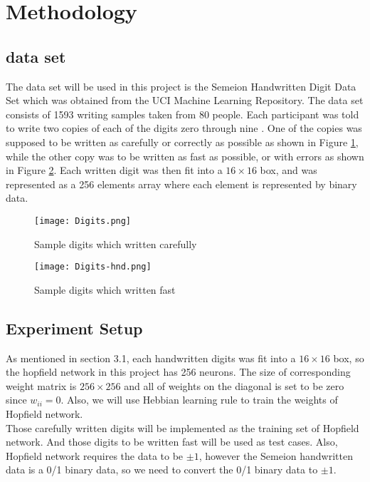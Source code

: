 \section{Methodology}
\subsection{data set}
The data set will be used in this project is the Semeion Handwritten Digit Data Set which was obtained from the UCI Machine Learning Repository\cite{bib:dataset}. The data set consists of 1593 writing samples taken from 80 people. Each participant was told to write two copies of each of the digits zero through nine . One of the copies was supposed to be written as carefully or correctly as possible as shown in Figure \ref{fg:ds1}, while the other copy was to be written as fast as possible, or with errors as shown in Figure \ref{fg:ds2}. Each written digit was then fit into a $16 \times 16$ box, and was represented as a 256 elements array where each element is represented by binary data.\\

\begin{figure}[h]
\centering
\texttt{[image: Digits.png]}
\caption{Sample digits which written carefully}
\label{fg:ds1}
\end{figure}

\begin{figure}[h]
\centering
\texttt{[image: Digits-hnd.png]}
\caption{Sample digits which written fast}
\label{fg:ds2}
\end{figure}

\subsection{Experiment Setup}
As mentioned in section 3.1, each handwritten digits was fit into a $16 \times 16$ box, so the hopfield network in this project has 256 neurons. The size of corresponding weight matrix is $256 \times 256$ and all of weights on the diagonal is set to be zero since $w_{ii} = 0$. Also, we will use Hebbian learning rule to train the weights of Hopfield network.\\

Those carefully written digits will be implemented as the training set of Hopfield network. And those digits to be written fast will be used as test cases. Also, Hopfield network requires the data to be $\pm 1$, however the Semeion handwritten data is a 0/1 binary data, so we need to convert the 0/1 binary data to $\pm 1$. \\

